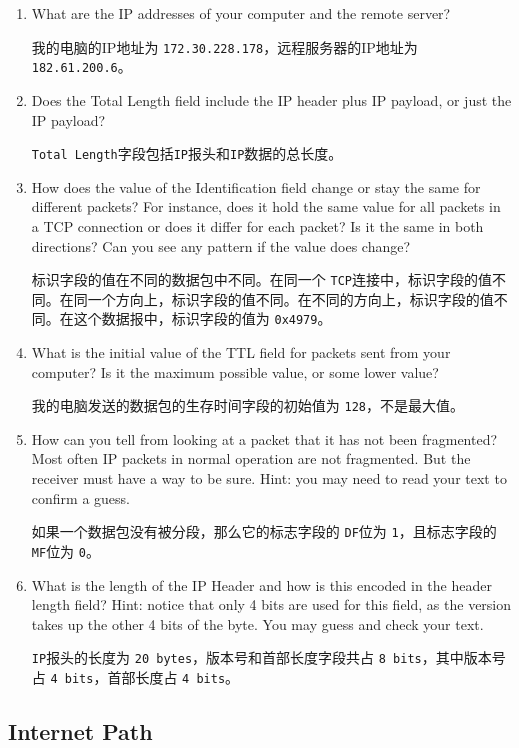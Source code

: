 \documentclass{article}
\begin{document}
\begin{enumerate}[noitemsep]
  \item What are the IP addresses of your computer and the remote server?

        我的电脑的IP地址为 \texttt{172.30.228.178}，远程服务器的IP地址为 \texttt{182.61.200.6}。
  \item Does the Total Length field include the IP header plus IP payload, or just the IP payload?

        \texttt{Total Length}字段包括\texttt{IP}报头和\texttt{IP}数据的总长度。
  \item How does the value of the Identification field change or stay the same for different packets? For instance, does it hold the same value for all packets in a TCP connection or does it differ for each packet? Is it the same in both directions? Can you see any pattern if the value does change?

        标识字段的值在不同的数据包中不同。在同一个 \texttt{TCP}连接中，标识字段的值不同。在同一个方向上，标识字段的值不同。在不同的方向上，标识字段的值不同。在这个数据报中，标识字段的值为 \texttt{0x4979}。
  \item What is the initial value of the TTL field for packets sent from your computer? Is it the maximum possible value, or some lower value?

        我的电脑发送的数据包的生存时间字段的初始值为 \texttt{128}，不是最大值。
  \item How can you tell from looking at a packet that it has not been fragmented? Most often IP packets in normal operation are not fragmented. But the receiver must have a way to be sure. Hint: you may need to read your text to confirm a guess.

        如果一个数据包没有被分段，那么它的标志字段的 \texttt{DF}位为 \texttt{1}，且标志字段的 \texttt{MF}位为 \texttt{0}。
  \item What is the length of the IP Header and how is this encoded in the header length field? Hint: notice that only 4 bits are used for this field, as the version takes up the other 4 bits of the byte. You may guess and check your text.

        \texttt{IP}报头的长度为 \texttt{20 bytes}，版本号和首部长度字段共占 \texttt{8 bits}，其中版本号占 \texttt{4 bits}，首部长度占 \texttt{4 bits}。
\end{enumerate}

\subsection{Internet Path}
\end{document}
